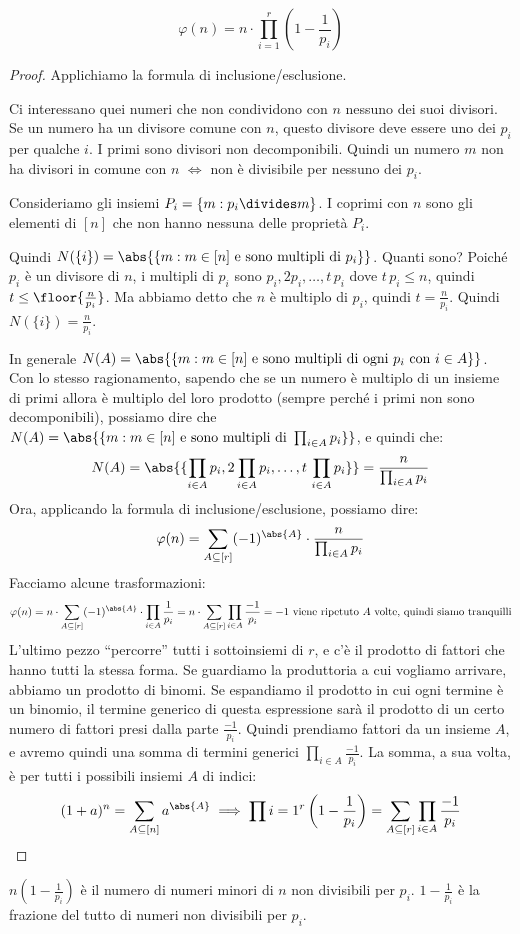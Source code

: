 \begin{theorem}
	\[
		\varphi(n) = n \cdot \prod_{i=1}^{r} \left( 1 - \frac{1}{p_i} \right)
	\]
\end{theorem}

\begin{proof}
	Applichiamo la formula di inclusione/esclusione.

	Ci interessano quei numeri che non condividono con $n$ nessuno dei suoi divisori.
	Se un numero ha un divisore comune con $n$, questo divisore deve essere uno dei $p_i$ per qualche $i$.
	I primi sono divisori non decomponibili.
	Quindi un numero $m$ non ha divisori in comune con $n$ $\iff$ non \`e divisibile per nessuno dei $p_i$.

	Consideriamo gli insiemi $P_i = \{ m : p_i \divides m \}$.
	I coprimi con $n$ sono gli elementi di $[n]$ che non hanno nessuna delle propriet\`a $P_i$.

	Quindi $N(\{i\}) = \abs{\{ m : m \in [n] \text{ e sono multipli di } p_i \}}$.
	Quanti sono?
	Poich\'e $p_i$ \`e un divisore di $n$, i multipli di $p_i$ sono $p_i, 2 p_i, \dots, t \, p_i$ dove $t \, p_i \le n$, quindi $t \le \floor{\frac{n}{p_i}}$.
	Ma abbiamo detto che $n$ \`e multiplo di $p_i$, quindi $t = \frac{n}{p_i}$.
	Quindi $N(\{i\}) = \frac{n}{p_i}$.

	In generale $N(A) = \abs{\{m : m \in [n] \text{ e sono multipli di ogni } p_i \text{ con } i \in A \}}$.
	Con lo stesso ragionamento, sapendo che se un numero \`e multiplo di un insieme di primi allora \`e multiplo del loro prodotto (sempre perch\'e i primi non sono decomponibili), possiamo dire che $N(A) = \abs{\{ m : m \in [n] \text{ e sono multipli di } \prod_{i \in A} p_i\}}$, e quindi che:
	\[
		N(A) = \abs{\{ \prod_{i \in A} p_i, 2 \prod_{i \in A} p_i, \dots, t \, \prod_{i \in A} p_i \}} = \frac{n}{\prod_{i \in A} p_i}
	\]
	Ora, applicando la formula di inclusione/esclusione, possiamo dire:
	\[
		\varphi(n) = \sum_{A \subseteq [r]} (-1)^{\abs{A}} \cdot \frac{n}{\prod_{i \in A} p_i}
	\]
	Facciamo alcune trasformazioni:
	\[
		\varphi(n) =  n \cdot \sum_{A \subseteq [r]} (-1)^{\abs{A}} \cdot \prod_{i \in A} \frac{1}{p_i} =
		n \cdot \sum_{A \subseteq [r]} \prod_{i \in A} \frac{-1}{p_i} = \text{$-1$ viene ripetuto $A$ volte, quindi siamo tranquilli}
	\]
	L'ultimo pezzo ``percorre'' tutti i sottoinsiemi di $r$, e c'\`e il prodotto di fattori che hanno tutti la stessa forma.
	Se guardiamo la produttoria a cui vogliamo arrivare, abbiamo un prodotto di binomi.
	Se espandiamo il prodotto in cui ogni termine \`e un binomio, il termine generico di questa espressione sar\`a il prodotto di un certo numero di fattori presi dalla parte $\frac{-1}{p_i}$.
	Quindi prendiamo fattori da un insieme $A$, e avremo quindi una somma di termini generici $\prod_{i \in A} \frac{-1}{p_i}$.
	La somma, a sua volta, \`e per tutti i possibili insiemi $A$ di indici:
	\[
		(1 + a)^n = \sum_{A \subseteq [n]} a^{\abs{A}} \implies \prod{i = 1}^{r} \left( 1 - \frac{1}{p_i} \right) = \sum_{A \subseteq [r]} \prod_{i \in A} \frac{-1}{p_i}
	\]
\end{proof}

$n \left( 1 - \frac{1}{p_i} \right)$ \`e il numero di numeri minori di $n$ non divisibili per $p_i$.
$1 - \frac{1}{p_i}$ \`e la frazione del tutto di numeri non divisibili per $p_i$.







